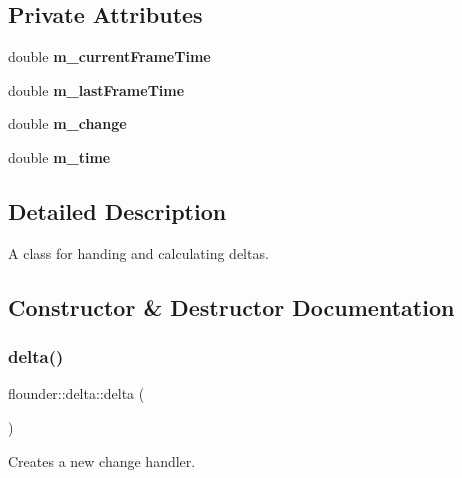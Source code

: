 \subsection*{Private Attributes}
\begin{DoxyCompactItemize}
\item 
\mbox{\label{classflounder_1_1delta_a922814fee4d3ad0be3f643b1801c9328}} 
double {\bfseries m\+\_\+current\+Frame\+Time}
\item 
\mbox{\label{classflounder_1_1delta_ac623d44d1250523c1b54801450924f7c}} 
double {\bfseries m\+\_\+last\+Frame\+Time}
\item 
\mbox{\label{classflounder_1_1delta_ad2cf30b37da5d4fd9b6a0871f59838fc}} 
double {\bfseries m\+\_\+change}
\item 
\mbox{\label{classflounder_1_1delta_abace656b4a93f9b24b1c9000e3c441ee}} 
double {\bfseries m\+\_\+time}
\end{DoxyCompactItemize}


\subsection{Detailed Description}
A class for handing and calculating deltas. 



\subsection{Constructor \& Destructor Documentation}
\mbox{\label{classflounder_1_1delta_a6996799d2f9423e994e2beb84dc3ba09}} 
\subsubsection{\texorpdfstring{delta()}{delta()}}
{\footnotesize\ttfamily flounder\+::delta\+::delta (\begin{DoxyParamCaption}{ }\end{DoxyParamCaption})}



Creates a new change handler. 

